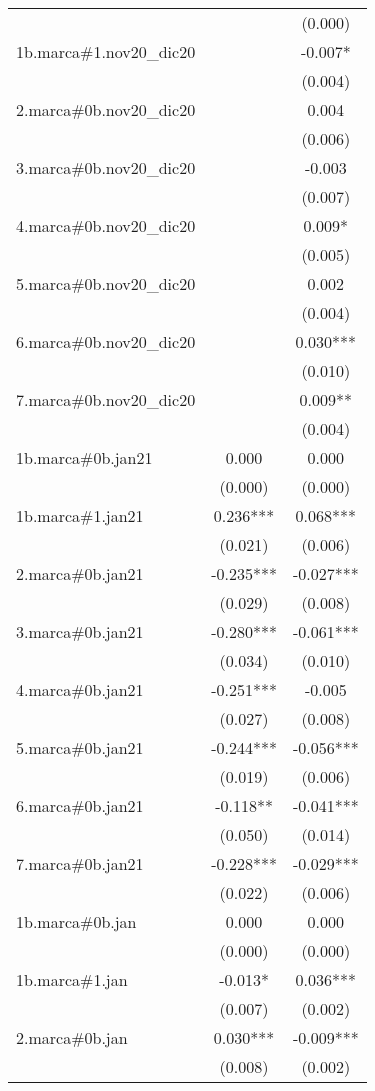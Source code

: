 \begin{tabular}{lcc}
 &  & (0.000) \\
1b.marca\#1.nov20\_dic20 &  & -0.007* \\
 &  & (0.004) \\
2.marca\#0b.nov20\_dic20 &  & 0.004 \\
 &  & (0.006) \\
3.marca\#0b.nov20\_dic20 &  & -0.003 \\
 &  & (0.007) \\
4.marca\#0b.nov20\_dic20 &  & 0.009* \\
 &  & (0.005) \\
5.marca\#0b.nov20\_dic20 &  & 0.002 \\
 &  & (0.004) \\
6.marca\#0b.nov20\_dic20 &  & 0.030*** \\
 &  & (0.010) \\
7.marca\#0b.nov20\_dic20 &  & 0.009** \\
 &  & (0.004) \\
1b.marca\#0b.jan21 & 0.000 & 0.000 \\
 & (0.000) & (0.000) \\
1b.marca\#1.jan21 & 0.236*** & 0.068*** \\
 & (0.021) & (0.006) \\
2.marca\#0b.jan21 & -0.235*** & -0.027*** \\
 & (0.029) & (0.008) \\
3.marca\#0b.jan21 & -0.280*** & -0.061*** \\
 & (0.034) & (0.010) \\
4.marca\#0b.jan21 & -0.251*** & -0.005 \\
 & (0.027) & (0.008) \\
5.marca\#0b.jan21 & -0.244*** & -0.056*** \\
 & (0.019) & (0.006) \\
6.marca\#0b.jan21 & -0.118** & -0.041*** \\
 & (0.050) & (0.014) \\
7.marca\#0b.jan21 & -0.228*** & -0.029*** \\
 & (0.022) & (0.006) \\
1b.marca\#0b.jan & 0.000 & 0.000 \\
 & (0.000) & (0.000) \\
1b.marca\#1.jan & -0.013* & 0.036*** \\
 & (0.007) & (0.002) \\
2.marca\#0b.jan & 0.030*** & -0.009*** \\
 & (0.008) & (0.002) \\

\end{tabular}
